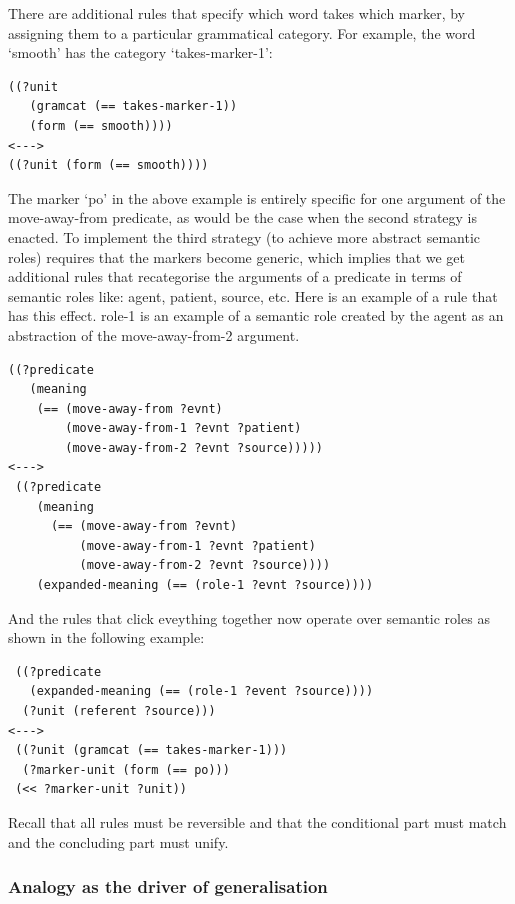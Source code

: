 There are additional rules that specify which word takes which marker, by assigning them to a particular 
grammatical category. For example, the word `smooth' has the category `takes-marker-1': 
\begin{verbatim}
((?unit
   (gramcat (== takes-marker-1)) 
   (form (== smooth))))
<---> 
((?unit (form (== smooth))))
\end{verbatim}

The marker `po' in the above example is entirely specific for one argument of the move-away-from predicate, as would be the 
case when the second strategy is enacted. To implement the third strategy 
(to achieve more abstract semantic roles) requires that the markers become generic, which implies that 
we get additional rules that recategorise the arguments of a predicate in terms of 
semantic roles like: agent, patient, source, etc. Here is an example of a rule that 
has this effect. role-1 is an example of a semantic role created by the agent as an abstraction of the 
move-away-from-2 argument. 
\begin{verbatim}
((?predicate
   (meaning
    (== (move-away-from ?evnt) 
        (move-away-from-1 ?evnt ?patient)
        (move-away-from-2 ?evnt ?source)))))
<---> 
 ((?predicate
    (meaning
      (== (move-away-from ?evnt)
          (move-away-from-1 ?evnt ?patient)
          (move-away-from-2 ?evnt ?source)))) 
    (expanded-meaning (== (role-1 ?evnt ?source))))
\end{verbatim}
And the rules that click eveything together now operate over semantic roles as shown in the following example: 
\begin{verbatim}
 ((?predicate
   (expanded-meaning (== (role-1 ?event ?source))))
  (?unit (referent ?source))) 
<---> 
 ((?unit (gramcat (== takes-marker-1)))
  (?marker-unit (form (== po))) 
 (<< ?marker-unit ?unit))
\end{verbatim}
Recall that all rules must be reversible and that the conditional part must match and the concluding part must unify.

\subsubsection{Analogy as the driver of generalisation}

